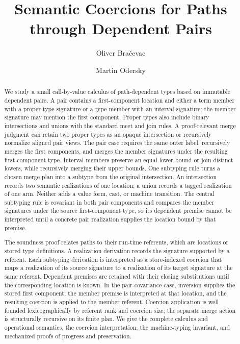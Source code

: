 \documentclass[acmsmall,screen,nonacm]{acmart}
\title{Semantic Coercions for Paths through Dependent Pairs}
\author{Oliver Bra\v{c}evac}
\author{Martin Odersky}
\begin{document}
\begin{abstract}
We study a small call-by-value calculus of path-dependent types based on
immutable dependent pairs. A pair contains a first-component location and
either a term member with a proper-type signature or a type member with an
interval signature; the member signature may mention the first component.
Proper types also include binary intersections and unions with the standard
meet and join rules. A proof-relevant merge judgment can retain two proper
types as an opaque intersection or recursively normalize aligned pair views.
The pair case requires the same outer label, recursively merges the first
components, and merges the member signatures under the resulting
first-component type. Interval members preserve an equal lower bound or join
distinct lowers, while recursively merging their upper bounds. One subtyping
rule turns a chosen merge plan into a subtype from the original intersection.
An intersection records two semantic realizations of one location; a union
records a tagged realization of one arm. Neither adds a value form, cast, or
machine transition.
The central subtyping rule is covariant in both pair components and compares
the member signatures under the source first-component type, so its dependent
premise cannot be interpreted until a concrete pair realization supplies the
location bound by that premise.

The soundness proof relates paths to their run-time referents, which are
locations or stored type definitions. A realization derivation records the
signature supported by a referent. Each subtyping derivation is interpreted
as a store-indexed coercion that maps a realization of its source signature
to a realization of its target signature at the same referent. Dependent
premises are retained with their closing substitutions until the corresponding
location is known. In the pair-covariance case, inversion supplies the stored first
component; the member premise is interpreted at that location, and the
resulting coercion is applied to the member referent. Coercion application is
well founded lexicographically by referent rank and coercion size; the separate
merge action is structurally recursive on its finite plan. We give the complete
calculus and operational semantics, the coercion interpretation, the
machine-typing invariant, and mechanized proofs of progress and preservation.
\end{abstract}

\end{document}
